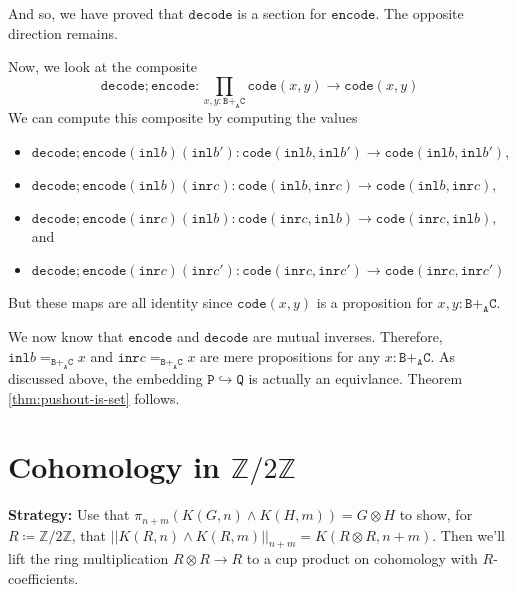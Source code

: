 \documentclass[12pt]{amsart}
\newcommand{\ZZ}{\mathbb{Z}}
\newcommand{\zmodtwo}{\ZZ / 2 \ZZ}
\newcommand{\from}{\colon}
\newcommand{\type}[1]{\mathtt{#1}}
\newcommand{\tin}{\colon}
\newcommand{\A}{\type{A}}
\newcommand{\B}{\type{B}}
\newcommand{\C}{\type{C}}
\renewcommand{\P}{\type{P}}
\newcommand{\Q}{\type{Q}}
\newcommand{\BAC}{\B +_{\A} \C}
\newcommand{\inl}{\type{inl}}
\newcommand{\inr}{\type{inr}}
\newcommand{\code}{\type{code}}
\newcommand{\encode}{\type{encode}}
\newcommand{\decode}{\type{decode}}
\theoremstyle{remark}
\theoremstyle{definition}
\begin{document}
And so, we have proved that \( \decode \) is a section for \( \encode
\). The opposite direction remains.


Now, we look at the composite
\[
  \decode ; \encode \from
  \prod\limits_{x,y \tin \BAC} \code ( x,y ) \to
  \code ( x,y )
\]
We can compute this composite by computing the values
%
\begin{itemize}
\item
  \(
    \decode ; \encode (\inl b ) ( \inl b' ) \from
    \code ( \inl b , \inl b' ) \to
    \code ( \inl b , \inl b' ),
  \)
\item
  \(
    \decode ; \encode (\inl b ) ( \inr c ) \from
    \code ( \inl b , \inr c ) \to
    \code ( \inl b , \inr c ),
  \)
\item
  \(
    \decode ; \encode (\inr c ) ( \inl b ) \from
    \code ( \inr c , \inl b ) \to
    \code ( \inr c , \inl b ),
    \)
  and  
\item
  \(
    \decode ; \encode (\inr c ) ( \inr c' ) \from
    \code ( \inr c , \inr c' ) \to
    \code ( \inr c , \inr c' )
  \)
\end{itemize}
%
But these maps are all identity since \( \code (x,y) \) is a
proposition for \( x , y \tin \BAC \).   
\par


We now know that
% 
\(
    \encode
\)
%
and
%
\(
    \decode
\)
% 
are mutual inverses. Therefore,
% 
\(
    \inl b =_{ \BAC  } x
\)
% 
and
%
\(
    \inr c =_{ \BAC } x
\)
% 
are mere propositions for any
%
\(
    x \tin \BAC.
\)
% 
As discussed above, the embedding
% 
\(
    \P \hookrightarrow \Q
\)
%
is actually an equivlance. Theorem \ref{thm:pushout-is-set} follows.

\section{Cohomology in $ \zmodtwo $}
\label{sec:cohomology--zz2zz}

\textbf{Strategy:}
Use that $ \pi_{n+m} ( K(G,n) \wedge K(H,m) ) = G \otimes H
$ to show, for $ R \coloneqq \zmodtwo $, that $ || K(R,n)
\wedge K(R,m) ||_{n+m} = K( R \otimes R, n+m ) $. Then we'll
lift the ring multiplication $ R \otimes R \to R $ to a cup
product on cohomology with $ R $-coefficients.
\end{document}
